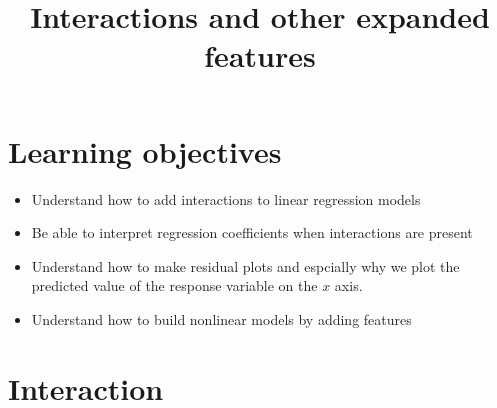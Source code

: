 




\title{Interactions and other expanded features}
\maketitle
\tableofcontents

\section{Learning objectives}

\begin{itemize}
\item Understand how to add interactions to linear regression models
\item Be able to interpret regression coefficients when interactions are present
\item Understand how to make residual plots and espcially why we plot the predicted value of the response variable on the $x$ axis.
\item Understand how to build nonlinear models by adding features
\end{itemize}
\section{Interaction}



